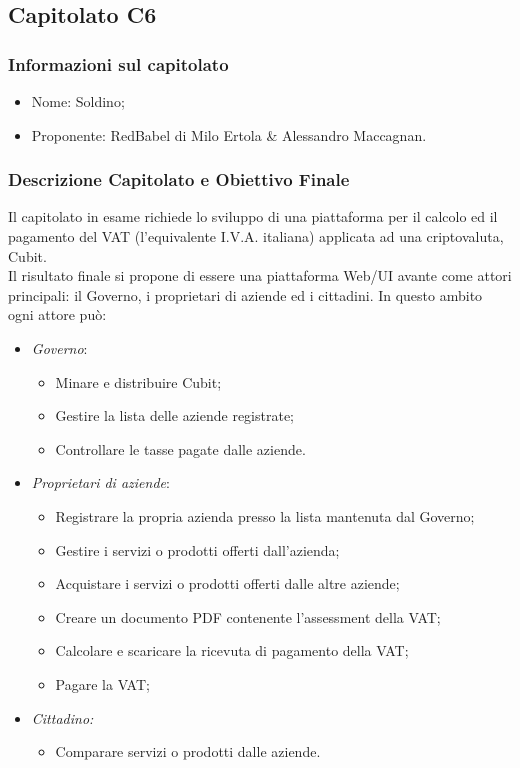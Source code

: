 \subsection{Capitolato C6}

\subsubsection{Informazioni sul capitolato}
\begin{itemize}
  \item{Nome}: Soldino;
  \item{Proponente}: RedBabel di Milo Ertola \& Alessandro Maccagnan.
\end{itemize}
\subsubsection{Descrizione Capitolato e Obiettivo Finale}
Il capitolato in esame richiede lo sviluppo di una piattaforma per il calcolo ed il pagamento del VAT (l'equivalente I.V.A. italiana) applicata ad una criptovaluta, Cubit. \\
Il risultato finale si propone di essere una piattaforma Web/UI avante come attori principali: il Governo, i proprietari di aziende ed i cittadini. In questo ambito ogni attore può:
\begin{itemize}
  \item \textit{Governo}:
  \begin{itemize}
    \item Minare e distribuire Cubit;
    \item Gestire la lista delle aziende registrate;
    \item Controllare le tasse pagate dalle aziende.
  \end{itemize}
  \item \textit{Proprietari di aziende}:
  \begin{itemize}
    \item Registrare la propria azienda presso la lista mantenuta dal Governo;
    \item Gestire i servizi o prodotti offerti dall'azienda;
    \item Acquistare i servizi o prodotti offerti dalle altre aziende;
    \item Creare un documento PDF contenente l'assessment della VAT;
    \item Calcolare e scaricare la ricevuta di pagamento della VAT;
    \item Pagare la VAT;
  \end{itemize}
  \item \textit{Cittadino:}
  \begin{itemize}
    \item Comparare servizi o prodotti dalle aziende.
  \end{itemize}
\end{itemize}

